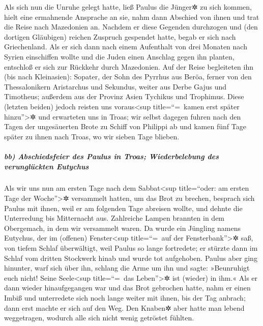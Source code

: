  Als sich nun die Unruhe gelegt hatte, ließ Paulus die
Jünger✲ zu sich kommen, hielt eine ermahnende Ansprache an sie, nahm
dann Abschied von ihnen und trat die Reise nach Mazedonien an.
 Nachdem er diese Gegenden durchzogen und (den dortigen
Gläubigen) reichen Zuspruch gespendet hatte, begab er sich nach
Griechenland.  Als er sich dann nach einem Aufenthalt von
drei Monaten nach Syrien einschiffen wollte und die Juden einen Anschlag
gegen ihn planten, entschloß er sich zur Rückkehr durch Mazedonien.
 Auf der Reise begleiteten ihn (bis nach Kleinasien):
Sopater, der Sohn des Pyrrhus aus Beröa, ferner von den Thessalonikern
Aristarchus und Sekundus, weiter aus Derbe Gajus und Timotheus; außerdem
aus der Provinz Asien Tychikus und Trophimus.  Diese
(letzten beiden) jedoch reisten uns voraus\textless sup title=``=~kamen
erst später hinzu''\textgreater✲ und erwarteten uns in Troas;
 wir selbst dagegen fuhren nach den Tagen der ungesäuerten
Brote zu Schiff von Philippi ab und kamen fünf Tage später zu ihnen nach
Troas, wo wir sieben Tage blieben.

\hypertarget{bb-abschiedsfeier-des-paulus-in-troas-wiederbelebung-des-verungluxfcckten-eutychus}{%
\subparagraph{bb) Abschiedsfeier des Paulus in Troas; Wiederbelebung des
verunglückten
Eutychus}\label{bb-abschiedsfeier-des-paulus-in-troas-wiederbelebung-des-verungluxfcckten-eutychus}}

 Als wir uns nun am ersten Tage nach dem
Sabbat\textless sup title=``oder: am ersten Tage der
Woche''\textgreater✲ versammelt hatten, um das Brot zu brechen, besprach
sich Paulus mit ihnen, weil er am folgenden Tage abreisen wollte, und
dehnte die Unterredung bis Mitternacht aus.  Zahlreiche
Lampen brannten in dem Obergemach, in dem wir versammelt waren.
 Da wurde ein Jüngling namens Eutychus, der im (offenen)
Fenster\textless sup title=``=~auf der Fensterbank''\textgreater✲ saß,
von tiefem Schlaf überwältigt, weil Paulus so lange fortredete; er
stürzte dann im Schlaf vom dritten Stockwerk hinab und wurde tot
aufgehoben.  Paulus aber ging hinunter, warf sich über
ihn, schlang die Arme um ihn und sagte: »Beunruhigt euch nicht! Seine
Seele\textless sup title=``=~das Leben''\textgreater✲ ist (wieder) in
ihm.«  Als er dann wieder hinaufgegangen war und das Brot
gebrochen hatte, nahm er einen Imbiß und unterredete sich noch lange
weiter mit ihnen, bis der Tag anbrach; dann erst machte er sich auf den
Weg.  Den Knaben✲ aber hatte man lebend weggetragen,
wodurch alle sich nicht wenig getröstet fühlten.

